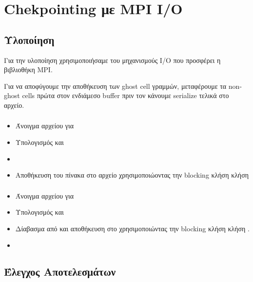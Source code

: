 \documentclass[11pt]{scrartcl} %
\begin{document}
\section{Chekpointing με MPI I/O}

    \subsection{Υλοποίηση}

    Για την υλοποίηση χρησιμοποιήσαμε του μηχανισμούς I/O που προσφέρει η βιβλιοθήκη MPI.

    Για να αποφύγουμε την αποθήκευση των ghost cell γραμμών, μεταφέρουμε τα
    non-ghost cells πρώτα στον ενδιάμεσο buffer  πριν τον κάνουμε
    serialize τελικά στο αρχείο.

        \subsubsection*{}
            \begin{itemize}
                \item Άνοιγμα αρχείου για 
                \item Υπολογισμός  και 
                \item {}
                \item Αποθήκευση του πίνακα  στο αρχείο χρησιμοποιώοντας την blocking κλήση κλήση 
            \end{itemize}
        \subsubsection*{}
            \begin{itemize}
                \item Άνοιγμα αρχείου για 
                \item Υπολογισμός  και 
                \item Δίαβασμα  από  και αποθήκευση στο  χρησιμοποιώντας την blocking κλήση κλήση .
                \item {}
            \end{itemize}


    \subsection{Έλεγχος Αποτελεσμάτων}
\end{document}
